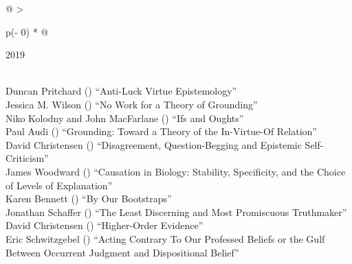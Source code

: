 \documentclass[
  10pt,
  letterpaper,
  DIV=11,
  numbers=noendperiod,
  twoside]{scrartcl}
\begin{document}
\begin{longtable}[]{@{}
  >{\raggedright\arraybackslash}p{(\columnwidth - 0\tabcolsep) * }@{}}

\caption{\label{tbl-top-ten-2010}Most cited articles published less than
ten years ago as of 2019.}

\tabularnewline

\toprule\noalign{}
\begin{minipage}[b]{\linewidth}\raggedright
2019
\end{minipage} \\
\midrule\noalign{}
\endhead
\bottomrule\noalign{}
\endlastfoot
Duncan Pritchard
()
``Anti-Luck Virtue Epistemology'' \\
Jessica M. Wilson
()
``No Work for a Theory of Grounding'' \\
Niko Kolodny and John MacFarlane
()
``Ifs and Oughts'' \\
Paul Audi
()
``Grounding: Toward a Theory of the In-Virtue-Of Relation'' \\
David Christensen
()
``Disagreement, Question-Begging and Epistemic Self-Criticism'' \\
James Woodward
()
``Causation in Biology: Stability, Specificity, and the Choice of Levels
of Explanation'' \\
Karen Bennett
()
``By Our Bootstraps'' \\
Jonathan Schaffer
()
``The Least Discerning and Most Promiscuous Truthmaker'' \\
David Christensen
()
``Higher-Order Evidence'' \\
Eric Schwitzgebel
()
``Acting Contrary To Our Professed Beliefs or the Gulf Between Occurrent
Judgment and Dispositional Belief'' \\

\end{longtable}
\end{document}
